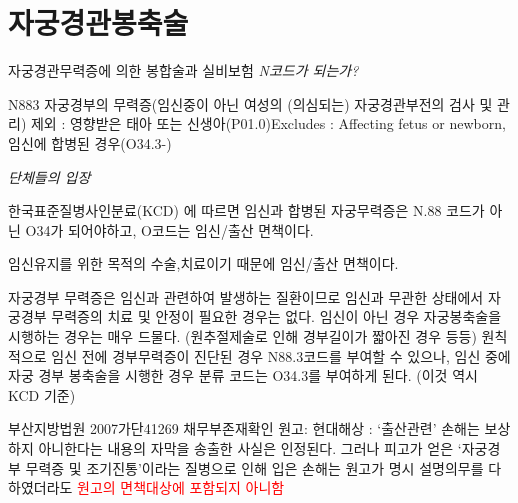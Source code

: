 \section{자궁경관봉축술}
{
}
\prezi{\clearpage}
\par
\medskip
\begin{commentbox}{자궁경관무력증에 의한 봉합술과 실비보험}
\emph{N코드가 되는가? }\par
N883 자궁경부의 무력증(임신중이 아닌 여성의 (의심되는) 자궁경관부전의 검사 및 관리) 
제외 : 영향받은 태아 또는 신생아(P01.0)Excludes : Affecting fetus or newborn, 임신에 합병된 경우(O34.3-)\par
\emph{단체들의 입장}\par
\begin{description}\tightlist
\item[통계청] 한국표준질병사인분료(KCD) 에 따르면 ﻿﻿임신과 합병된 자궁무력증은 N.88 코드가 아닌 O34가 되어야하고, O코드는 임신/출산 면책이다.
\item[보험사] 임신유지를 위한 목적의 수술,치료이기 때문에 임신/출산 면책이다.﻿﻿
\item[산부인과학회] 자궁경부 무력증은 임신과 관련하여 발생하는 질환이므로 임신과 무관한 상태에서 자궁경부 무력증의 치료 및 안정이 필요한 경우는 없다.﻿﻿
임신이 아닌 경우 자궁봉축술을 시행하는 경우는 매우 드물다. (원추절제술로 인해 경부길이가 짧아진 경우 등등) 원칙적으로 임신 전에 경부무력증이 진단된 경우 N88.3코드를 부여할 수 있으나, 임신 중에 자궁 경부 봉축술을 시행한 경우 분류 코드는 O34.3를 부여하게 된다.​﻿﻿ (이것 역시 KCD 기준)
\item[판례] 부산지방법원 2007가단41269 채무부존재확인 원고: 현대해상 : ‘출산관련’ 손해는 보상하지 아니한다는 내용의 자막을 송출한 사실은 인정된다. 그러나 피고가 얻은 ‘자궁경부 무력증 및 조기진통’이라는 질병으로 인해 입은 손해는 원고가 명시 설명의무를 다하였더라도 \textcolor{red}{원고의 면책대상에 포함되지 아니함}
\end{description}
\end{commentbox}
\prezi{\clearpage}
\par
\medskip
